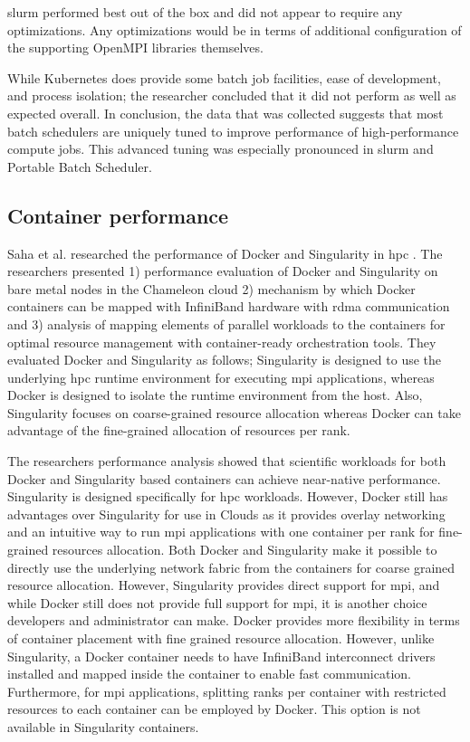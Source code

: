 \documentclass[conference]{IEEEtran}
\begin{document}
\gls{slurm} performed best out of the box and did not appear to require any optimizations. Any optimizations would be in terms of additional configuration of the supporting OpenMPI libraries themselves.

While Kubernetes does provide some batch job facilities, ease of development, and process isolation; the researcher concluded that it did not perform as well as expected overall. In conclusion, the data that was collected suggests that most batch schedulers are uniquely tuned to improve performance of high-performance compute jobs. This advanced tuning was especially pronounced in \gls{slurm} and Portable Batch Scheduler.


\subsection{Container performance}
Saha et al. researched the performance of Docker and Singularity in \gls{hpc} \cite{saha2018evaluation}. The researchers presented 1) performance evaluation of Docker and Singularity on bare metal nodes in the Chameleon cloud 2) mechanism by which Docker containers can be mapped with InfiniBand hardware with \gls{rdma} communication and 3) analysis of mapping elements of parallel workloads to the containers for optimal resource management with container-ready orchestration tools. They evaluated Docker and Singularity as follows; Singularity is designed to use the underlying \gls{hpc} runtime environment for executing \gls{mpi} applications, whereas Docker is designed to isolate the runtime environment from the host. Also, Singularity focuses on coarse-grained resource allocation whereas Docker can take advantage of the fine-grained allocation of resources per rank.

The researchers performance analysis showed that scientific workloads for both Docker and Singularity based containers can achieve near-native performance. Singularity is designed specifically for \gls{hpc} workloads. However, Docker still has advantages over Singularity for use in Clouds as it provides overlay networking and an intuitive way to run \gls{mpi} applications with one container per rank for fine-grained resources allocation. Both Docker and Singularity make it possible to directly use the underlying network fabric from the containers for coarse grained resource allocation. However, Singularity provides direct support for \gls{mpi}, and while Docker still does not provide full support for \gls{mpi}, it is another choice developers and administrator can make. Docker provides more flexibility in terms of container placement with fine grained resource allocation. However, unlike Singularity, a Docker container needs to have InfiniBand interconnect drivers installed and mapped inside the container to enable fast communication. Furthermore, for \gls{mpi} applications, splitting ranks per container with restricted resources to each container can be employed by Docker. This option is not available in Singularity containers.
\end{document}
